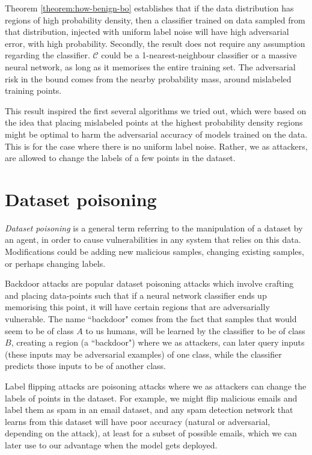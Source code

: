 \documentclass{ociamthesis}
\begin{document}
Theorem \ref{theorem:how-benign-bo} establishes that if the data distribution
has regions of high probability density, then a classifier trained on data
sampled from that distribution, injected with uniform label noise will have high
adversarial error, with high probability. Secondly, the result does not require
any assumption regarding the classifier. $\mathcal{C}$ could be a
1-nearest-neighbour classifier or a massive neural network, as long as it
memorises the entire training set. The adversarial risk in the bound comes from
the nearby probability mass, around mislabeled training points.


This result inspired the first several algorithms we tried out, which were based
on the idea that placing mislabeled points at the highest probability density
regions might be optimal to harm the adversarial accuracy of models trained on
the data. This is for the case where there is no uniform label noise. Rather, we
as attackers, are allowed to change the labels of a few points in the dataset.


\section{Dataset poisoning}
\emph{Dataset poisoning} \citep{just-how-toxic,
DBLP:journals/corr/abs-1712-05526} is a general term referring to the
manipulation of a dataset by an agent, in order to cause vulnerabilities in any
system that relies on this data. Modifications could be adding new malicious
samples, changing existing samples, or perhaps changing labels.

Backdoor attacks
\citep{DBLP:journals/corr/abs-1712-05526,hidden-trigger-backdoor,
transferable-clean-label-poisoning} are popular dataset poisoning attacks which
involve crafting and placing data-points such that if a neural network
classifier ends up memorising this point, it will have certain regions that are
adversarially vulnerable. The name ``backdoor" comes from the fact that samples
that would seem to be of class $A$ to us humans, will be learned by the
classifier to be of class $B$, creating a region (a ``backdoor") where we as
attackers, can later query inputs (these inputs may be adversarial examples) of
one class, while the classifier predicts those inputs to be of another class.

Label flipping attacks \citep{label-flip-SVMs,certified-robustness} are
poisoning attacks where we as attackers can change the labels of points in the
dataset. For example, we might flip malicious emails and label them as spam in
an email dataset, and any spam detection network that learns from this dataset
will have poor accuracy (natural or adversarial, depending on the attack), at
least for a subset of possible emails, which we can later use to our advantage
when the model gets deployed.
\end{document}
